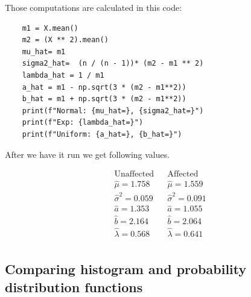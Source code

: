 \documentclass[12pt,a4paper]{article} %
\begin{document}
Those computations are calculated in this code:

\begin{lstlisting}
    m1 = X.mean()
    m2 = (X ** 2).mean()
    mu_hat= m1
    sigma2_hat=  (n / (n - 1))* (m2 - m1 ** 2)
    lambda_hat = 1 / m1
    a_hat = m1 - np.sqrt(3 * (m2 - m1**2))
    b_hat = m1 + np.sqrt(3 * (m2 - m1**2))
    print(f"Normal: {mu_hat=}, {sigma2_hat=}")
    print(f"Exp: {lambda_hat=}")
    print(f"Uniform: {a_hat=}, {b_hat=}")
\end{lstlisting}

After we have it run we get following values.

\begin{align*}
  &\text{Unaffected}       & &\text{Affected} \\
  &\hat\mu = 1.758         & &\hat\mu = 1.559\\
  &\hat\sigma^2 = 0.059    & &\hat\sigma^2 = 0.091\\
  &\hat a = 1.353          & &\hat a = 1.055\\
  &\hat b = 2.164          & &\hat b = 2.064\\
  &\hat\lambda = 0.568     & &\hat\lambda = 0.641\\
\end{align*}


\subsection{Comparing histogram and probability distribution functions}
\end{document}
